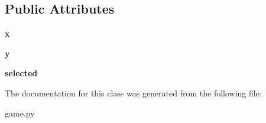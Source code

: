 \subsection*{Public Attributes}
\begin{DoxyCompactItemize}
\item 
\hypertarget{classgame_1_1GridTile_aaf405723011f6d0b226713bf57fa9761}{{\bfseries x}}\label{classgame_1_1GridTile_aaf405723011f6d0b226713bf57fa9761}

\item 
\hypertarget{classgame_1_1GridTile_ae897d68c280cc0d0927f50093a036c00}{{\bfseries y}}\label{classgame_1_1GridTile_ae897d68c280cc0d0927f50093a036c00}

\item 
\hypertarget{classgame_1_1GridTile_afa378f455ed5696bee6f1baedb6f8e8e}{{\bfseries selected}}\label{classgame_1_1GridTile_afa378f455ed5696bee6f1baedb6f8e8e}

\end{DoxyCompactItemize}


The documentation for this class was generated from the following file\-:\begin{DoxyCompactItemize}
\item 
game.\-py\end{DoxyCompactItemize}

